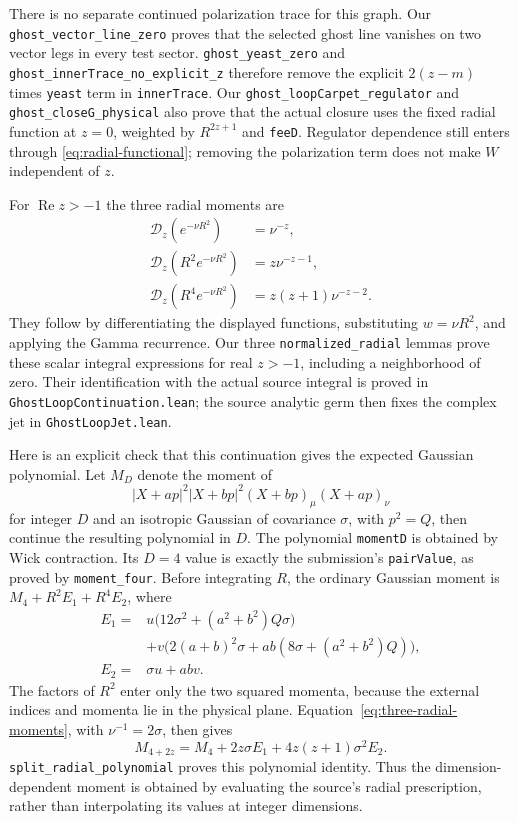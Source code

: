 \documentclass[11pt]{article}
\newcommand{\code}[1]{{\small\nolinkurl{#1}}}
\begin{document}
There is no separate continued polarization trace for this graph.
Our \code{ghost_vector_line_zero} proves that the selected ghost line
vanishes on two vector legs in every test sector.
\code{ghost_yeast_zero} and \code{ghost_innerTrace_no_explicit_z}
therefore remove the explicit $2(z-m)$ times \code{yeast} term in
\code{innerTrace}. Our \code{ghost_loopCarpet_regulator} and
\code{ghost_closeG_physical} also prove that the actual closure uses
the fixed radial function at $z=0$, weighted by $R^{2z+1}$ and
\code{feeD}. Regulator dependence still enters through
\eqref{eq:radial-functional}; removing the polarization term does not
make $W$ independent of $z$.

For $\operatorname{Re}z>-1$ the three radial moments are
\begin{align}
 \mathcal D_z(e^{-\nu R^2})&=\nu^{-z},\nonumber\\
 \mathcal D_z(R^2e^{-\nu R^2})&=z\nu^{-z-1},\label{eq:three-radial-moments}\\
 \mathcal D_z(R^4e^{-\nu R^2})&=z(z+1)\nu^{-z-2}.\nonumber
\end{align}
They follow by differentiating the displayed functions, substituting
$w=\nu R^2$, and applying the Gamma recurrence. Our three
\code{normalized_radial} lemmas prove these scalar integral
expressions for real $z>-1$, including a neighborhood of zero.
Their identification with the actual source integral is proved in
\code{GhostLoopContinuation.lean}; the source analytic germ then fixes
the complex jet in \code{GhostLoopJet.lean}.

Here is an explicit check that this continuation gives the expected
Gaussian polynomial. Let $M_D$ denote the moment of
\[
 |X+ap|^2|X+bp|^2(X+bp)_\mu(X+ap)_\nu
\]
for integer $D$ and an isotropic Gaussian of covariance $\sigma$,
with $p^2=Q$, then continue the resulting polynomial in $D$. The polynomial \code{momentD} is obtained by Wick
contraction. Its $D=4$ value is exactly the submission's
\code{pairValue}, as proved by \code{moment_four}.
Before integrating $R$, the ordinary Gaussian moment is
$M_4+R^2E_1+R^4E_2$, where
\begin{align*}
 E_1={}&u\bigl(12\sigma^2+(a^2+b^2)Q\sigma\bigr)\\
 &+v\bigl(2(a+b)^2\sigma+ab(8\sigma+(a^2+b^2)Q)\bigr),\\
 E_2={}&\sigma u+abv.
\end{align*}
The factors of $R^2$ enter only the two squared momenta, because
the external indices and momenta lie in the physical plane.
Equation~\eqref{eq:three-radial-moments}, with $\nu^{-1}=2\sigma$,
then gives
\[
 M_{4+2z}=M_4+2z\sigma E_1+4z(z+1)\sigma^2E_2.
\]
\code{split_radial_polynomial} proves this polynomial identity.
Thus the dimension-dependent moment is obtained by evaluating the
source's radial prescription, rather than interpolating its values
at integer dimensions.
\end{document}
